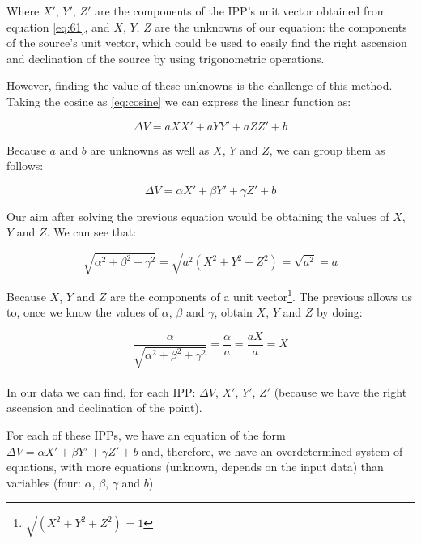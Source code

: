 Where $X'$, $Y'$, $Z'$ are the components of the IPP's unit vector obtained from equation \ref{eq:61}, and $X$, $Y$, $Z$ are the unknowns of our equation: the components of the source's unit vector, which could be used to easily find the right ascension and declination of the source by using trigonometric operations.

However, finding the value of these unknowns is the challenge of this method. Taking the cosine as \ref{eq:cosine} we can express the linear function as:

\begin{equation} \label{eq:substitute}
\Delta V = aXX' + aYY' + aZZ' + b
\end{equation}

Because $a$ and $b$ are unknowns as well as $X$, $Y$ and $Z$, we can group them as follows:

\begin{equation} \label{eq:newNames}
\Delta V = \alpha X' +  \beta Y' +  \gamma Z' + b
\end{equation}

Our aim after solving the previous equation would be obtaining the values of $X$, $Y$ and $Z$. We can see that:

\begin{equation} \label{eq:elTrucoDelAlmendruco}
\sqrt{\alpha^{2}+\beta^{2}+\gamma^{2}} = \sqrt{a^{2}(X^{2}+Y^{2}+Z^{2})} = \sqrt{a^{2}} = a
\end{equation}

Because $X$, $Y$ and $Z$ are the components of a unit vector\footnote{$\sqrt{(X^{2}+Y^{2}+Z^{2})} = 1$}. The previous allows us to, once we know the values of $\alpha$, $\beta$ and $\gamma$, obtain $X$, $Y$ and $Z$ by doing:

\begin{equation} \label{eq:iso}
\frac{\alpha}{\sqrt{\alpha^{2}+\beta^{2}+\gamma^{2}}} = \frac{\alpha}{a} = \frac{aX}{a} = X
\end{equation} \\

In our data we can find, for each IPP: $\Delta V$, $X'$, $Y'$, $Z'$ (because we have the right ascension and declination of the point).

For each of these IPPs, we have an equation of the form $\Delta V = \alpha X' +  \beta Y' +  \gamma Z' + b$ and, therefore, we have an overdetermined system of equations, with more equations (unknown, depends on the input data) than variables (four: $\alpha$, $\beta$, $\gamma$ and $b$)


